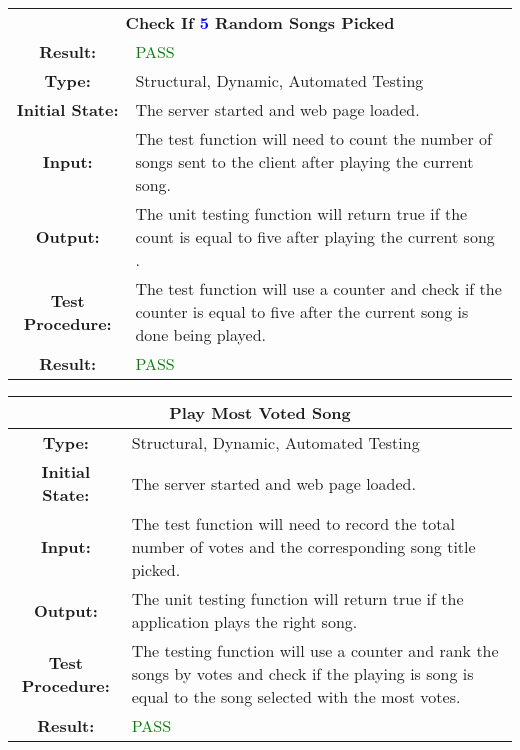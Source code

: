 \documentclass[12pt, titlepage]{article}
\newcommand{\numberOfSongs}{\textcolor{blue}{5 }}
\begin{document}
\begin{center}
\begin{table}[H]
\begin{tabularx}{\textwidth}{| c X |}
\hline
\multicolumn{2}{|c|}{\textbf{Check If \numberOfSongs Random Songs Picked}}\\


\textbf{Result: } & \textcolor{green}{PASS}\\
\hline
\textbf{Type: } & Structural, Dynamic, Automated Testing\\


\textbf{Initial State: } & The server started and web page loaded.\\


\textbf{Input: } & The test function will need to count the number of songs sent to the client after playing the current song.\\


\textbf{Output: } & The unit testing function will return true if the count is equal to five after playing the current song .\\


\textbf{Test Procedure: } &The test function will use a counter and check if the counter is equal to five after the current song is done being played. \\


\textbf{Result: } & \textcolor{green}{PASS}\\
\hline
\end{tabularx}
\end{table}
\end{center}


\begin{center}
\begin{table}[H]
\begin{tabularx}{\textwidth}{| c X |}
\hline
\multicolumn{2}{|c|}{\textbf{Play Most Voted Song}}\\
\hline
\textbf{Type: } & Structural, Dynamic, Automated Testing\\


\textbf{Initial State: } & The server started and web page loaded.\\


\textbf{Input: } & The test function will need to record the total number of votes and the corresponding song title picked.\\


\textbf{Output: } & The unit testing function will return true if the application plays the right song.\\


\textbf{Test Procedure: } &The testing function will use a counter and rank the songs by votes and check if the playing is song is equal to the song selected with the most votes. \\


\textbf{Result: } & \textcolor{green}{PASS}\\
\hline
\end{tabularx}
\end{table}
\end{center}
\end{document}
